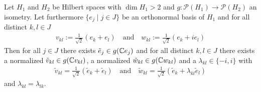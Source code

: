\begin{lemma} \label{lemma:aux_last}
	Let $H_1$ and $H_2$ be Hilbert spaces with $\dim H_1 >2$ and $g: \mathcal{P}(H_1) \to \mathcal{P}(H_2)$ an isometry. Let furthermore $\{e_j \mid j \in J\}$ be an orthonormal basis of $H_1$ and for all distinct $k,l \in J$ 
	\begin{align*}
		v_{kl} := \frac{1}{\sqrt{2}}(e_k + e_l) \quad \text{and} \quad w_{kl} := \frac{1}{\sqrt{2}}(e_k + ie_l)
	\end{align*}
	Then for all $j \in J$ there exists $\tilde{e}_j \in g(\mathbb{C} e_j)$ and for all distinct $k,l \in J$ there exists a normalized $\tilde{v}_{kl} \in g(\mathbb{C} v_{kl})$, a normalized $\tilde{w}_{kl} \in g(\mathbb{C} w_{kl})$ and a $\lambda_{kl} \in \{-i, i\}$ with 
	\begin{align*}
		\tilde{v}_{kl} = \frac{1}{\sqrt{2}}(\tilde{e}_k + \tilde{e}_l) \quad \text{and} \quad \tilde{w}_{kl} = \frac{1}{\sqrt{2}}(\tilde{e}_k + \lambda_{kl} \tilde{e}_l)
	\end{align*}
	and $\lambda_{kl} = \lambda_{lk}$.
\end{lemma}

